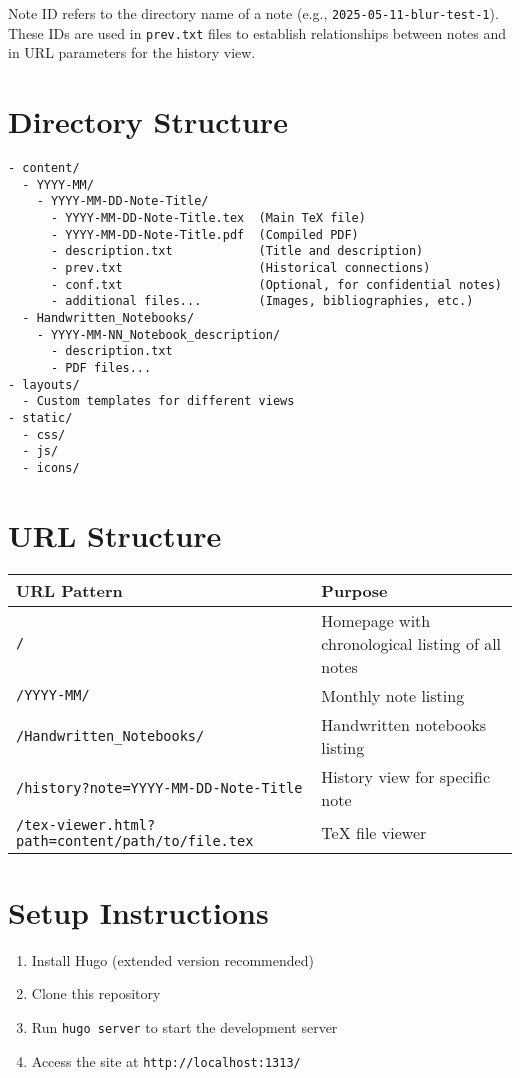 \documentclass{article}
\begin{document}
Note ID refers to the directory name of a note (e.g., \texttt{2025-05-11-blur-test-1}). These IDs are used in \texttt{prev.txt} files to establish relationships between notes and in URL parameters for the history view.

\section{Directory Structure}

\begin{verbatim}
- content/
  - YYYY-MM/
    - YYYY-MM-DD-Note-Title/
      - YYYY-MM-DD-Note-Title.tex  (Main TeX file)
      - YYYY-MM-DD-Note-Title.pdf  (Compiled PDF)
      - description.txt            (Title and description)
      - prev.txt                   (Historical connections)
      - conf.txt                   (Optional, for confidential notes)
      - additional files...        (Images, bibliographies, etc.)
  - Handwritten_Notebooks/
    - YYYY-MM-NN_Notebook_description/
      - description.txt
      - PDF files...
- layouts/
  - Custom templates for different views
- static/
  - css/
  - js/
  - icons/
\end{verbatim}

\section{URL Structure}

\begin{tabular}{|l|l|}
\hline
\textbf{URL Pattern} & \textbf{Purpose} \\
\hline
\texttt{/} & Homepage with chronological listing of all notes \\
\texttt{/YYYY-MM/} & Monthly note listing \\
\texttt{/Handwritten\_Notebooks/} & Handwritten notebooks listing \\
\texttt{/history?note=YYYY-MM-DD-Note-Title} & History view for specific note \\
\texttt{/tex-viewer.html?path=content/path/to/file.tex} & TeX file viewer \\
\hline
\end{tabular}

\section{Setup Instructions}

\begin{enumerate}
  \item Install Hugo (extended version recommended)
  \item Clone this repository
  \item Run \texttt{hugo server} to start the development server
  \item Access the site at \texttt{http://localhost:1313/}
\end{enumerate}
\end{document}
